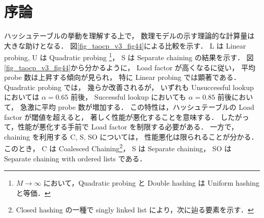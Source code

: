 \chapter{序論}
\label{chap_Introduction}

ハッシュテーブルの挙動を理解する上で，
数理モデルの示す理論的な計算量は大きな助けとなる．
図\ref{fig_taocp_v3_fig44}に\citep{knuth1998}よる比較を示す．
L は Linear probing,
U は Quadratic probing \footnote{$M \rightarrow \infty$ において，Quadratic probing と Double hashing は Uniform hashing と等価．}，
S は Separate chaining の結果を示す．
図\ref{fig_taocp_v3_fig44}から分かるように，
Load factor が高くなるに従い，
平均 probe 数は上昇する傾向が見られ，
特に Linear probing では顕著である．
Quadratic probing では，
幾らか改善されるが，
いずれも
Unsuccessful lookup においては $\alpha = 0.65$ 前後，
Successful lookup においても $\alpha = 0.85$ 前後において，
急激に平均 probe 数が増加する．
この特性は，ハッシュテーブルの Load factor が閾値を超えると，
著しく性能が悪化することを意味する．
したがって，性能が悪化する手前で Load factor を制限する必要がある．
一方で，chaining を利用する C, S, SO については，
性能悪化は限られることが分かる．
このとき，
C は Coalesced Chaining\footnote{Closed hashing の一種で singly linked list により，次に辿る要素を示す．}，
S は Separate chaining，
SO は Separate chaining with ordered lists である．




